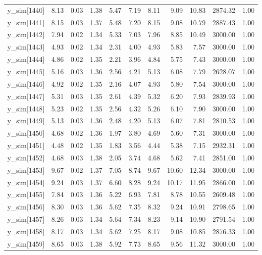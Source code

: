 \begin{table}[ht]
\begin{tabular}{rrrrrrrrrrr}
  y\_sim[1440] & 8.13 & 0.03 & 1.38 & 5.47 & 7.19 & 8.11 & 9.09 & 10.83 & 2874.32 & 1.00 \\ 
  y\_sim[1441] & 8.15 & 0.03 & 1.37 & 5.48 & 7.20 & 8.15 & 9.08 & 10.79 & 2887.43 & 1.00 \\ 
  y\_sim[1442] & 7.94 & 0.02 & 1.34 & 5.33 & 7.03 & 7.96 & 8.85 & 10.49 & 3000.00 & 1.00 \\ 
  y\_sim[1443] & 4.93 & 0.02 & 1.34 & 2.31 & 4.00 & 4.93 & 5.83 & 7.57 & 3000.00 & 1.00 \\ 
  y\_sim[1444] & 4.86 & 0.02 & 1.35 & 2.21 & 3.96 & 4.84 & 5.75 & 7.43 & 3000.00 & 1.00 \\ 
  y\_sim[1445] & 5.16 & 0.03 & 1.36 & 2.56 & 4.21 & 5.13 & 6.08 & 7.79 & 2628.07 & 1.00 \\ 
  y\_sim[1446] & 4.92 & 0.02 & 1.35 & 2.16 & 4.07 & 4.93 & 5.80 & 7.54 & 3000.00 & 1.00 \\ 
  y\_sim[1447] & 5.31 & 0.03 & 1.35 & 2.61 & 4.39 & 5.32 & 6.20 & 7.93 & 2839.93 & 1.00 \\ 
  y\_sim[1448] & 5.23 & 0.02 & 1.35 & 2.56 & 4.32 & 5.26 & 6.10 & 7.90 & 3000.00 & 1.00 \\ 
  y\_sim[1449] & 5.13 & 0.03 & 1.36 & 2.48 & 4.20 & 5.13 & 6.07 & 7.81 & 2810.53 & 1.00 \\ 
  y\_sim[1450] & 4.68 & 0.02 & 1.36 & 1.97 & 3.80 & 4.69 & 5.60 & 7.31 & 3000.00 & 1.00 \\ 
  y\_sim[1451] & 4.48 & 0.02 & 1.35 & 1.83 & 3.56 & 4.44 & 5.38 & 7.15 & 2932.31 & 1.00 \\ 
  y\_sim[1452] & 4.68 & 0.03 & 1.38 & 2.05 & 3.74 & 4.68 & 5.62 & 7.41 & 2851.00 & 1.00 \\ 
  y\_sim[1453] & 9.67 & 0.02 & 1.37 & 7.05 & 8.74 & 9.67 & 10.60 & 12.34 & 3000.00 & 1.00 \\ 
  y\_sim[1454] & 9.24 & 0.03 & 1.37 & 6.60 & 8.28 & 9.24 & 10.17 & 11.95 & 2866.00 & 1.00 \\ 
  y\_sim[1455] & 7.84 & 0.03 & 1.36 & 5.22 & 6.93 & 7.81 & 8.78 & 10.55 & 2609.48 & 1.00 \\ 
  y\_sim[1456] & 8.30 & 0.03 & 1.36 & 5.62 & 7.35 & 8.32 & 9.24 & 10.91 & 2798.65 & 1.00 \\ 
  y\_sim[1457] & 8.26 & 0.03 & 1.34 & 5.64 & 7.34 & 8.23 & 9.14 & 10.90 & 2791.54 & 1.00 \\ 
  y\_sim[1458] & 8.17 & 0.03 & 1.34 & 5.62 & 7.25 & 8.17 & 9.08 & 10.85 & 2876.33 & 1.00 \\ 
  y\_sim[1459] & 8.65 & 0.03 & 1.38 & 5.92 & 7.73 & 8.65 & 9.56 & 11.32 & 3000.00 & 1.00 \\ 

\end{tabular}
\end{table}
